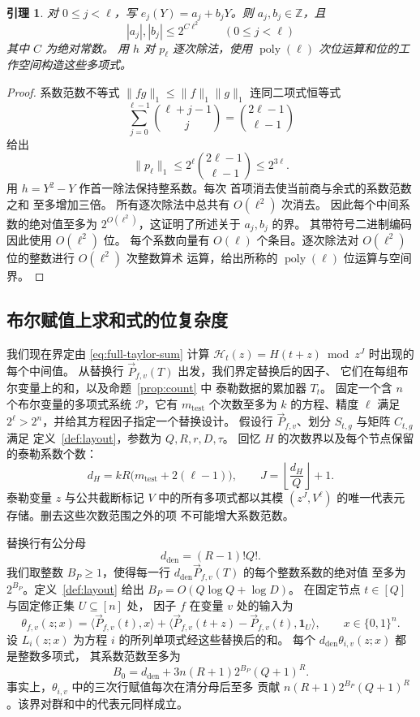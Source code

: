 \documentclass[11pt,reqno]{amsart}
\numberwithin{equation}{section}
\newtheorem{lemma}[theorem]{引理}
\theoremstyle{definition}\newtheorem{definition}[theorem]{定义}
\theoremstyle{remark}\newtheorem{remark}[theorem]{注}
\newcommand{\poly}{\operatorname{poly}}
\renewcommand{\le}{\leqslant}
\renewcommand{\ge}{\geqslant}
\begin{document}
\begin{lemma}\label{lem:rational-lift-height}
对 $0\le j<\ell$，写 $e_j(Y)=a_j+b_jY$。则 $a_j,b_j\in\mathbb Z$，且
\[
 |a_j|,|b_j|\le2^{C\ell^2}\qquad(0\le j<\ell)
\]
其中 $C$ 为绝对常数。
用 $h$ 对 $p_\ell$ 逐次除法，使用 $\poly(\ell)$ 次位运算和位的工作空间构造这些多项式。
\end{lemma}
\begin{proof}
系数范数不等式
$\|fg\|_1\le\|f\|_1\|g\|_1$ 连同二项式恒等式
\[
 \sum_{j=0}^{\ell-1}\binom{\ell+j-1}{j}
 =\binom{2\ell-1}{\ell-1}
\]
给出
\[
 \|p_\ell\|_1\le2^\ell\binom{2\ell-1}{\ell-1}\le2^{3\ell}.
\]
用 $h=Y^2-Y$ 作首一除法保持整系数。每次
首项消去使当前商与余式的系数范数之和
至多增加三倍。
所有逐次除法中总共有 $O(\ell^2)$ 次消去。
因此每个中间系数的绝对值至多为
$2^{O(\ell^2)}$，这证明了所述关于 $a_j,b_j$ 的界。
其带符号二进制编码因此使用 $O(\ell^2)$ 位。
每个系数向量有 $O(\ell)$
个条目。逐次除法对 $O(\ell^2)$ 位的整数进行 $O(\ell^2)$ 次整数算术
运算，给出所称的
$\poly(\ell)$ 位运算与空间界。
\end{proof}
\subsection{布尔赋值上求和式的位复杂度}
\label{subsec:rational-streaming-height}
我们现在界定由 \eqref{eq:full-taylor-sum} 计算
$\mathcal H_t(z)=H(t+z)\bmod z^J$ 时出现的每个中间值。
从替换行 $\vec{P}_{f,v}(T)$ 出发，我们界定替换后的因子、
它们在每组布尔变量上的和，以及命题~\ref{prop:count} 中
泰勒数据的累加器 $T_t$。
固定一个含 $n$ 个布尔变量的多项式系统 $\mathcal P$，它有
$m_{\mathrm{test}}$ 个次数至多为 $k$ 的方程、精度
$\ell$ 满足 $2^\ell>2^n$，并给其方程因子指定一个替换设计。
假设行 $\vec{P}_{f,v}$、划分 $S_{t,g}$ 与矩阵 $C_{t,g}$ 满足
定义~\ref{def:layout}，参数为 $Q,R,r,D,\tau$。
回忆 $H$ 的次数界以及每个节点保留的泰勒系数个数：
\[
 d_H=kR\bigl(m_{\mathrm{test}}+2(\ell-1)\bigr),\qquad
 J=\left\lfloor\frac{d_H}{Q}\right\rfloor+1.
\]
泰勒变量 $z$ 与公共截断标记 $V$ 中的所有多项式都以其模
$(z^J,V^\ell)$ 的唯一代表元存储。删去这些次数范围之外的项
不可能增大系数范数。

替换行有公分母
\[
 d_{\mathrm{den}}=(R-1)!Q!.
\]
我们取整数 $B_P\ge1$，使得每一行
$d_{\mathrm{den}}\vec{P}_{f,v}(T)$ 的每个整数系数的绝对值
至多为 $2^{B_P}$。定义~\ref{def:layout} 给出
$B_P=O(Q\log Q+\log D)$。
在固定节点 $t\in[Q]$ 与固定修正集 $U\subseteq[n]$ 处，
因子 $f$ 在变量 $v$ 处的输入为
\[
 \theta_{f,v}(z;x)=\langle \vec{P}_{f,v}(t), x\rangle+
       \bigl\langle \vec{P}_{f,v}(t+z)-\vec{P}_{f,v}(t),\mathbf1_U\bigr\rangle,
 \qquad x\in\{0,1\}^n.
\]
设 $L_i(z;x)$ 为方程 $i$ 的所列单项式经这些替换后的和。
每个 $d_{\mathrm{den}}\theta_{i,v}(z;x)$ 都是整数多项式，
其系数范数至多为
\[
 B_0=d_{\mathrm{den}}+3n(R+1)2^{B_P}(Q+1)^R .
\]
事实上，$\theta_{i,v}$ 中的三次行赋值每次在清分母后至多
贡献 $n(R+1)2^{B_P}(Q+1)^R$。该界对群和中的代表元同样成立。
\end{document}
